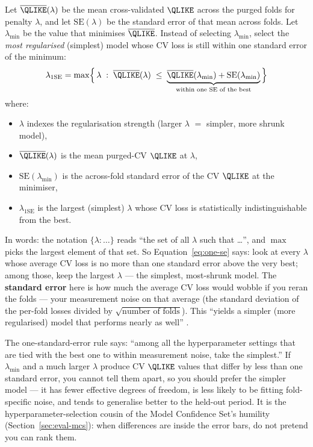 \begin{keyidea}
Let $\overline{\QLIKE}(\lambda)$ be the mean cross-validated $\QLIKE$ across the purged folds for penalty $\lambda$, and let $\mathrm{SE}(\lambda)$ be the standard error of that mean across folds.
Let $\lambda_{\min}$ be the value that minimises $\overline{\QLIKE}$.
Instead of selecting $\lambda_{\min}$, select the \emph{most regularised} (simplest) model whose CV loss is still within one standard error of the minimum:
\begin{equation}
\label{eq:one-se}
\lambda_{\text{1SE}} = \max\Bigl\{\,\lambda \;:\; \overline{\QLIKE}(\lambda) \;\leq\; \underbrace{\overline{\QLIKE}(\lambda_{\min}) + \mathrm{SE}(\lambda_{\min})}_{\text{within one SE of the best}} \,\Bigr\}
\end{equation}
where:
\begin{itemize}[nosep]
  \item $\lambda$ indexes the regularisation strength (larger $\lambda$ $=$ simpler, more shrunk model),
  \item $\overline{\QLIKE}(\lambda)$ is the mean purged-CV $\QLIKE$ at $\lambda$,
  \item $\mathrm{SE}(\lambda_{\min})$ is the across-fold standard error of the CV $\QLIKE$ at the minimiser,
  \item $\lambda_{\text{1SE}}$ is the largest (simplest) $\lambda$ whose CV loss is statistically indistinguishable from the best.
\end{itemize}
In words: the notation $\{\lambda : \ldots\}$ reads ``the set of all $\lambda$ such that \ldots'', and $\max$ picks the largest element of that set. So Equation~\eqref{eq:one-se} says: look at every $\lambda$ whose average CV loss is no more than one standard error above the very best; among those, keep the largest $\lambda$ --- the simplest, most-shrunk model.
The \textbf{standard error} here is how much the average CV loss would wobble if you reran the folds --- your measurement noise on that average (the standard deviation of the per-fold losses divided by $\sqrt{\text{number of folds}}$).
This ``yields a simpler (more regularised) model that performs nearly as well'' \citep[the one-standard-error rule predates this source, originating with Breiman et al.\ (CART, 1984) and Hastie, Tibshirani \& Friedman, ESL;][applies it in the purged-CV setting]{LopezdePrado2018}.
\end{keyidea}

\begin{intuition}
The one-standard-error rule says: ``among all the hyperparameter settings that are tied with the best one to within measurement noise, take the simplest.''
If $\lambda_{\min}$ and a much larger $\lambda$ produce CV $\QLIKE$ values that differ by less than one standard error, you cannot tell them apart, so you should prefer the simpler model --- it has fewer effective degrees of freedom, is less likely to be fitting fold-specific noise, and tends to generalise better to the held-out period.
It is the hyperparameter-selection cousin of the Model Confidence Set's humility (Section~\ref{sec:eval-mcs}): when differences are inside the error bars, do not pretend you can rank them.
\end{intuition}

